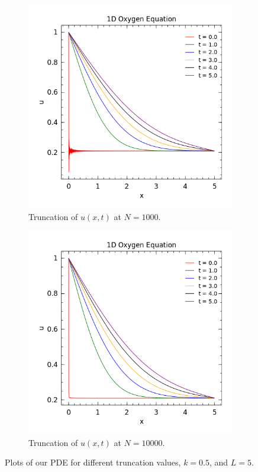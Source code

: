 \documentclass[12pt]{article}
\theoremstyle{remark}
\begin{document}
\begin{figure}[H]
	\centering
	\begin{subfigure}{.5\textwidth}
		\centering
		\includegraphics[width=1\linewidth]{Q5_1000.png}
		\caption*{Truncation of $u(x,t)$ at $N = 1000$.}
		\label{fig:sub1}
	\end{subfigure}%
	\begin{subfigure}{.5\textwidth}
		\centering
		\includegraphics[width=1\linewidth]{Q5_10000.png}
		\caption*{Truncation of $u(x,t)$ at $N = 10000$.}
		\label{fig:sub2}
	\end{subfigure}
	\caption{Plots of our PDE for different truncation values, $k = 0.5$, and $L = 5$.}
	\label{fig:test}
\end{figure}
\end{document}

